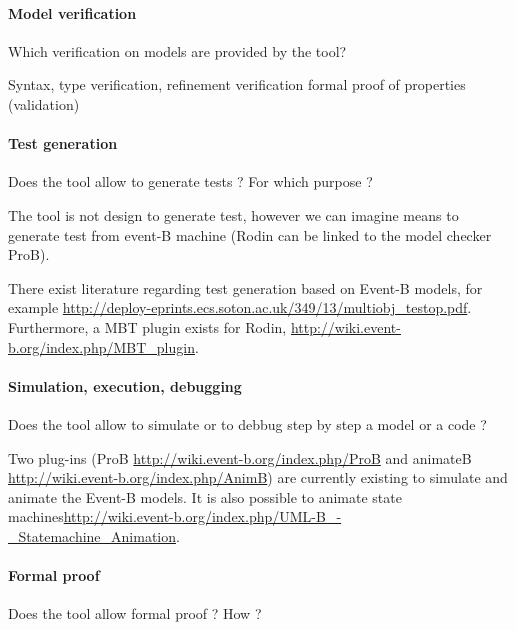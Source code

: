 \paragraph{Model verification}
Which verification on models are provided by the tool?

\begin{author_comment}

Syntax, type verification,
refinement verification
formal proof of properties (validation)
\end{author_comment}

\paragraph{Test generation}
Does the tool allow to generate tests ? For  which purpose ?

\begin{author_comment}

The tool is not design to generate test, however we can imagine means to  generate test from event-B machine (Rodin can be linked to the model checker ProB).
\end{author_comment}

\begin{assessor2}
  There exist literature regarding test generation based on Event-B
  models, for example
  \url{http://deploy-eprints.ecs.soton.ac.uk/349/13/multiobj_testop.pdf}. Furthermore,
  a MBT plugin exists for Rodin,
  \url{http://wiki.event-b.org/index.php/MBT_plugin}.
\end{assessor2}

\paragraph{Simulation, execution, debugging}
Does the tool allow to simulate or to debbug step by step a model or a code ?

\begin{author_comment}

Two plug-ins (ProB \url{http://wiki.event-b.org/index.php/ProB} and animateB \url{http://wiki.event-b.org/index.php/AnimB}) are currently existing to simulate and animate the Event-B models. It is also possible to animate state machines\url{http://wiki.event-b.org/index.php/UML-B_-_Statemachine_Animation}.
\end{author_comment}

\paragraph{Formal proof}
Does the tool allow formal proof ?  How ?


